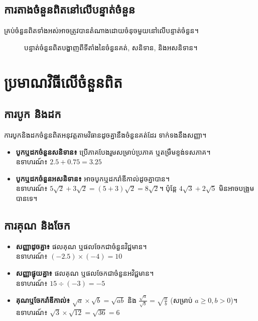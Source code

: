\subsection{ការតាងចំនួនពិតនៅលើបន្ទាត់ចំនួន}
គ្រប់ចំនួនពិតទាំងអស់អាចត្រូវបានតំណាងដោយចំនុចមួយនៅលើបន្ទាត់ចំនួន។
\begin{figure}[h!]
    \centering
    \caption{បន្ទាត់ចំនួនពិតបង្ហាញពីទីតាំងនៃចំនួនគត់, សនិទាន, និងអសនិទាន។}
\end{figure}

\section{ប្រមាណវិធីលើចំនួនពិត}
\subsection{ការបូក និងដក}
ការបូកនិងដកចំនួនពិតអនុវត្តតាមវិធានដូចគ្នានឹងចំនួនគត់ដែរ ទាក់ទងនឹងសញ្ញា។
\begin{itemize}[label=-]
    \item \textbf{បូកឬដកចំនួនសនិទាន៖} ប្រើភាគបែងរួមសម្រាប់ប្រភាគ ឬតម្រឹមខ្ទង់ទសភាគ។\\
    ឧទាហរណ៍៖ $2.5 + 0.75 = 3.25$
    \item \textbf{បូកឬដកចំនួនអសនិទាន៖} អាចបូកឬដករ៉ាឌីកាល់ដូចគ្នាបាន។\\
    ឧទាហរណ៍៖ $5\sqrt{2} + 3\sqrt{2} = (5+3)\sqrt{2} = 8\sqrt{2}$។ ប៉ុន្តែ $4\sqrt{3} + 2\sqrt{5}$ មិនអាចបង្រួមបានទេ។
\end{itemize}

\subsection{ការគុណ និងចែក}
\begin{itemize}[label=-]
    \item \textbf{សញ្ញាដូចគ្នា៖} ផលគុណ ឬផលចែកជាចំនួនវិជ្ជមាន។\\
    ឧទាហរណ៍៖ $(-2.5) \times (-4) = 10$
    \item \textbf{សញ្ញាផ្ទុយគ្នា៖} ផលគុណ ឬផលចែកជាចំនួនអវិជ្ជមាន។\\
    ឧទាហរណ៍៖ $15 \div (-3) = -5$
    \item \textbf{គុណឬចែករ៉ាឌីកាល់៖} $\sqrt{a} \times \sqrt{b} = \sqrt{ab}$ និង $\frac{\sqrt{a}}{\sqrt{b}} = \sqrt{\frac{a}{b}}$ (សម្រាប់ $a \ge 0, b > 0$)។\\
    ឧទាហរណ៍៖ $\sqrt{3} \times \sqrt{12} = \sqrt{36} = 6$
\end{itemize}

